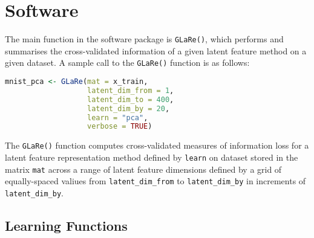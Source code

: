 \section{Software}\label{sec:software}

The main function in the  software package is \texttt{GLaRe()}, which performs and summarises the cross-validated information of a given latent feature method on a given dataset.
A sample call to the \texttt{GLaRe()} function is as follows:
\begin{lstlisting}[language=R]
mnist_pca <- GLaRe(mat = x_train,
                   latent_dim_from = 1,
                   latent_dim_to = 400,
                   latent_dim_by = 20,
                   learn = "pca",
                   verbose = TRUE)
\end{lstlisting}
The \texttt{GLaRe()} function computes cross-validated measures of information loss for a latent feature representation method defined by \texttt{learn} on dataset stored in the matrix \texttt{mat} across a range of latent feature dimensions defined by a grid of equally-spaced valiues from \texttt{latent\_dim\_from} to \texttt{latent\_dim\_by} in increments of \texttt{latent\_dim\_by}.

\subsection{Learning Functions}\label{sec:learning-functions}

